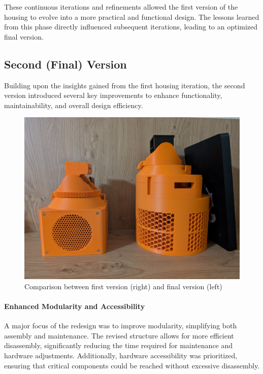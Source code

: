 These continuous iterations and refinements allowed the first version of the housing to evolve into a more practical and functional design. The lessons learned from this phase directly influenced subsequent iterations, leading to an optimized final version.  

  
  
\subsection{Second (Final) Version}\label{subsec:housing_second_version}
Building upon the insights gained from the first housing iteration, the second version introduced several key improvements to enhance functionality, maintainability, and overall design efficiency.  

\begin{figure}
	\centering
	\includegraphics[width=1.0\linewidth]{figures/old_and_new_station_comparison}
	\caption{Comparison between first version (right) and final version (left)}
	\label{fig:oldandnewstationcomparison}
\end{figure}


\paragraph{Enhanced Modularity and Accessibility}  
A major focus of the redesign was to improve modularity, simplifying both assembly and maintenance. The revised structure allows for more efficient disassembly, significantly reducing the time required for maintenance and hardware adjustments. Additionally, hardware accessibility was prioritized, ensuring that critical components could be reached without excessive disassembly.  

